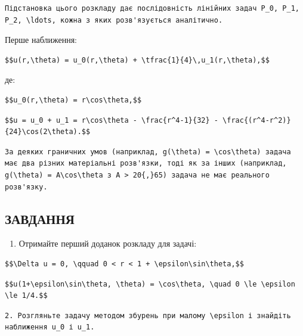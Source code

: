 \documentclass[
  ukrainian,
]{article}
\providecommand{\tightlist}{%
  \setlength{\itemsep}{0pt}\setlength{\parskip}{0pt}}
\begin{document}
\begin{verbatim}
Підстановка цього розкладу дає послідовність лінійних задач P_0, P_1, P_2, \ldots, кожна з яких розв'язується аналітично.
\end{verbatim}

Перше наближення:

\begin{verbatim}
$$u(r,\theta) = u_0(r,\theta) + \tfrac{1}{4}\,u_1(r,\theta),$$
\end{verbatim}

де:

\begin{verbatim}
$$u_0(r,\theta) = r\cos\theta,$$
\end{verbatim}

\begin{verbatim}
$$u = u_0 + u_1 = r\cos\theta - \frac{r^4-1}{32} - \frac{(r^4-r^2)}{24}\cos(2\theta).$$
\end{verbatim}

\begin{verbatim}
За деяких граничних умов (наприклад, g(\theta) = \cos\theta) задача має два різних матеріальні розв'язки, тоді як за інших (наприклад, g(\theta) = A\cos\theta з A > 20{,}65) задача не має реального розв'язку.
\end{verbatim}

\subsection{ЗАВДАННЯ}\label{ux437ux430ux432ux434ux430ux43dux43dux44f-26}

\begin{enumerate}
\def\labelenumi{\arabic{enumi}.}
\tightlist
\item
  Отримайте перший доданок розкладу для задачі:
\end{enumerate}

\begin{verbatim}
$$\Delta u = 0, \qquad 0 < r < 1 + \epsilon\sin\theta,$$
\end{verbatim}

\begin{verbatim}
$$u(1+\epsilon\sin\theta, \theta) = \cos\theta, \quad 0 \le \epsilon \le 1/4.$$
\end{verbatim}

\begin{verbatim}
2. Розгляньте задачу методом збурень при малому \epsilon і знайдіть наближення u_0 і u_1.
\end{verbatim}
\end{document}
